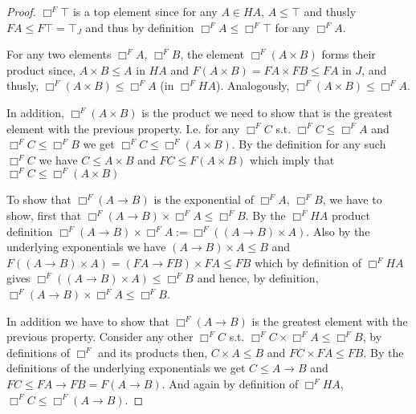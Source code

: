 			\begin{proof}
				$\Box^F \top$ is a top element since for any $A\in HA$, 
				$A\le \top$ and thusly $FA\le F\top=\top_J$ and thus by definition
				$\Box^F A\le\Box^F\top $ for any $\Box^F A$.

				For any two elements $\Box^F A$, $\Box^F B$, 
				the element $\Box^F (A \times B)$ forms their product since,
				$A \times B\le A$ in $HA$ and $F(A\times B)=FA\times FB \le FA$
				in $J$, and thusly, 
				$\Box^F (A \times B)\le \Box^FA$ (in $\Box^F HA$).
				Analogously, $\Box^F (A \times B)\le \Box^FA$.

				In addition, $\Box^F (A \times B)$ is the product we need to show 
				that is the greatest element with the previous property.
				I.e. for any $\Box^F C$ s.t. $\Box^F C\le \Box^F A $ and 
				$\Box^F C\le \Box^F B $ we get $\Box^F C\le\Box^F(A\times B)$. 
				By the definition for any such  $\Box^F C$ we have $C\le A\times B$
				and $FC\le F(A\times B)$ which imply that $\Box^F C\le\Box^F(A\times B)$

				To show that  $\Box^F(A\rightarrow B)$ is the  
				exponential of $\Box^FA$, $\Box^FB$, 
				we have to show, first that 
				$\Box^F ( A\rightarrow B)\times\Box^F A\le \Box^F B$.
				By the $\Box^F HA$ product definition 
				$\Box^F ( A\rightarrow B)\times\Box^F A :=\Box^F( (A\rightarrow B)\times A)$. 
				Also
				by the underlying exponentials we have $ (A\rightarrow B)\times A\le B$ 
				and  $F((A\rightarrow B)\times A)= (FA\rightarrow FB)\times FA \le FB$
				which by definition of $\Box^F HA$ gives   
				$\Box^F((A\rightarrow B)\times A)\le \Box^F B$ 
				and hence, by definition, 
				$\Box^F ( A\rightarrow B)\times \Box^F A\le \Box^F B$.

				In addition we have to show that 
				$\Box^F ( A\rightarrow B)$ is the 
				greatest element with the previous property.
				Consider any other $\Box^F C$ s.t. $\Box^F C\times\Box^F A\le \Box^F B$, 
				by definitions of $\Box^F$ and its products then, $C\times A\le B$
				 and $FC\times FA\le FB$.
				  By the definitions of the underlying exponentials 
				 we get $C\le A\rightarrow B$ and 
				 $FC \le FA\rightarrow FB =F(A\rightarrow B)$. 
				 And again by definition of $\Box^F HA$, $\Box^F C\le \Box^F(A\rightarrow B)$.  
			\end{proof}


